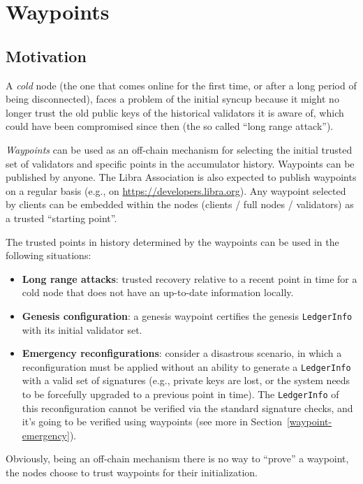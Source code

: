 \documentclass[letterpaper,10pt]{article}
\begin{document}
\section{Waypoints}
\label{waypoints}
\subsection{Motivation}
\label{waypoint-motivation}
A \emph{cold} node (the one that comes online for the first time, or after a long period of being disconnected), faces a problem of the initial syncup because it might no longer trust the old public keys of the historical validators it is aware of, which could have been compromised since then (the so called “long range attack”).

\emph{Waypoints} can be used  as an off-chain mechanism for selecting the initial trusted set of validators and specific points in the accumulator history. Waypoints can be published by anyone. The Libra Association is also expected to publish waypoints on a regular basis (e.g., on \url{https://developers.libra.org}). Any waypoint selected by clients can be embedded within the nodes (clients / full nodes / validators) as a trusted “starting point”.

The trusted points in history determined by the waypoints can be used in the following situations:
\begin{itemize}
\item \textbf{Long range attacks}: trusted recovery relative to a recent point in time for a cold node that does not have an up-to-date information locally.
\item \textbf{Genesis configuration}: a genesis waypoint certifies the genesis \texttt{LedgerInfo} with its initial validator set.
\item \textbf{Emergency reconfigurations}: consider a disastrous scenario, in which a reconfiguration must be applied without an ability to generate a \texttt{LedgerInfo} with a valid set of signatures (e.g., private keys are lost, or the system needs to be forcefully upgraded to a previous point in time). The \texttt{LedgerInfo} of this reconfiguration cannot be verified via the standard signature checks, and it's going to be verified using waypoints (see more in Section~\ref{waypoint-emergency}).
\end{itemize}

Obviously, being an off-chain mechanism there is no way to “prove” a waypoint, the nodes choose to trust waypoints for their initialization.
\end{document}
